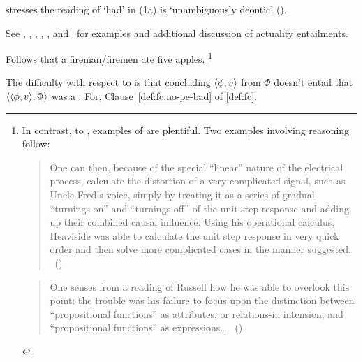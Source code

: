 \begin{note}
{    \citeauthor{Alxatib:2019wf} stresses the reading of `had' in (1a) is `unambiguously deontic' (\citeyear[703]{Alxatib:2019wf}).

    See \textcite{Asher:2012vr}, \textcite{Bhatt:2008aa}, \textcite{Hacquard:2006to,Hacquard:2009ta}, \textcite{Palmer:1977wb}, \textcite{Pinon:2003te}, and~\textcite{Werner:2011tp} for examples and additional discussion of actuality entailments.
  }
  Follows that a fireman/firemen ate five apples.%
  \footnote{
    In contrast, to \BoyPS{}, examples of \BoyPSC{} are plentiful.
    Two examples involving reasoning follow:

    \begin{quote}
      One can then, because of the special ``linear'' nature of the electrical process, calculate the distortion of a very complicated signal, such as Uncle Fred's voice, simply by treating it as a series of gradual ``turnings on'' and ``turnings off'' of the unit step response and adding up their combined causal influence.
      Using his operational calculus, Heaviside was able to calculate the unit step response in very quick order and then solve more complicated cases in the manner suggested.%
      \mbox{ }\hfill\mbox{(\cite[316]{Wilson:1988wx})}
    \end{quote}

     \begin{quote}
       One senses from a reading of Russell how he was able to overlook this point:
       the trouble was his failure to focus upon the distinction between ``propositional functions'' as attributes, or relations-in intension, and ``propositional functions'' as expressions\dots%
      \mbox{ }\hfill\mbox{(\cite[152]{Quine:1967tv})}
    \end{quote}

  }



  The difficulty with respect to  is that concluding \(\langle \phi, v \rangle\) from \(\Phi\) doesn't entail that \(\langle \langle \phi, v \rangle, \Phi \rangle\) was a \fc{}.
  For, Clause~\ref{def:fc:no-pe-bad} of \autoref{def:fc}.


\end{note}
